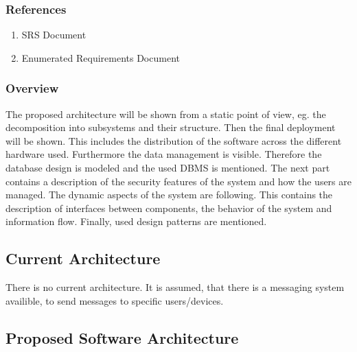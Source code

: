 		\subsubsection{References}
			\begin{enumerate}
				\item SRS Document
				\item Enumerated Requirements Document
			\end{enumerate}
		\subsubsection{Overview}
			The proposed architecture will be shown from a static point of view, eg. the decomposition into subsystems and their structure. Then the final deployment will be shown. This includes the distribution of the software across the different hardware used. Furthermore the data management is visible. Therefore the database design is modeled and the used DBMS is mentioned. The next part contains a description of the security features of the system and how the users are managed. The dynamic aspects of the system are following. This contains the description of interfaces between components, the behavior of the system and information flow. Finally, used design patterns are mentioned.

	\subsection{Current Architecture}
		There is no current architecture. It is assumed, that there is a messaging system availible, to send messages to specific users/devices.

	\subsection{Proposed Software Architecture}
